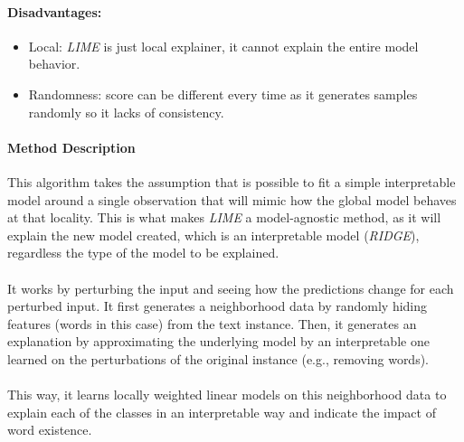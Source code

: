 \paragraph{Disadvantages:}
\begin{itemize}
	\item Local: \emph{LIME} is just local explainer, it cannot explain the entire model behavior.
	\item Randomness: score can be different every time as it generates samples randomly so it lacks of consistency.
\end{itemize}

\paragraph{Method Description} This algorithm takes the assumption that is possible to fit a simple interpretable model around a single observation that will mimic how the global model behaves at that locality. This is what makes \emph{LIME} a model-agnostic method, as it will explain the new model created, which is an interpretable model (\emph{RIDGE}), regardless the type of the model to be explained.
\paragraph{}
It works by perturbing the input and seeing how the predictions change for each perturbed input. It first generates a neighborhood data by randomly hiding features (words in this case) from the text instance.  Then, it generates an explanation by approximating the underlying model by an interpretable one learned on the perturbations of the original instance (e.g., removing words).
\paragraph{}
This way, it learns locally weighted linear models on this neighborhood data to explain each of the classes in an interpretable way and indicate the impact of word existence.
